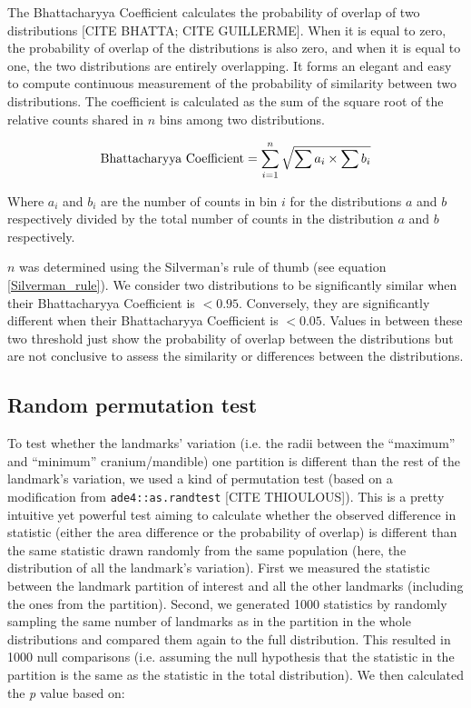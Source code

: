 \documentclass[a4paper,11pt]{article}
\begin{document}
The Bhattacharyya Coefficient calculates the probability of overlap of two distributions [CITE BHATTA; CITE GUILLERME].
When it is equal to zero, the probability of overlap of the distributions is also zero, and when it is equal to one, the two distributions are entirely overlapping.
It forms an elegant and easy to compute continuous measurement of the probability of similarity between two distributions.
The coefficient is calculated as the sum of the square root of the relative counts shared in $n$ bins among two distributions.

\begin{equation}
    \textnormal{Bhattacharyya Coefficient}=\sum_{i=1}^{n} \sqrt{{\sum{a_i}}\times{\sum{b_i}}}
\end{equation}

\noindent Where ${a_i}$ and ${b_i}$  are the number of counts in bin $i$ for the distributions $a$ and $b$ respectively divided by the total number of counts in the distribution $a$ and $b$ respectively.

$n$ was determined using the Silverman's rule of thumb (see equation \ref{Silverman_rule}).
We consider two distributions to be significantly similar when their Bhattacharyya Coefficient is $< 0.95$.
Conversely, they are significantly different when their Bhattacharyya Coefficient is $< 0.05$.
Values in between these two threshold just show the probability of overlap between the distributions but are not conclusive to assess the similarity or differences between the distributions.

\subsection{Random permutation test}

To test whether the landmarks' variation (i.e. the radii between the ``maximum'' and ``minimum'' cranium/mandible) one partition is different than the rest of the landmark's variation, we used a kind of permutation test (based on a modification from \texttt{ade4::as.randtest} [CITE THIOULOUS]).
This is a pretty intuitive yet powerful test aiming to calculate whether the observed difference in statistic (either the area difference or the probability of overlap) is different than the same statistic drawn randomly from the same population (here, the distribution of all the landmark's variation).
First we measured the statistic between the landmark partition of interest and all the other landmarks (including the ones from the partition).
Second, we generated 1000 statistics by randomly sampling the same number of landmarks as in the partition in the whole distributions and compared them again to the full distribution.
This resulted in 1000 null comparisons (i.e. assuming the null hypothesis that the statistic in the partition is the same as the statistic in the total distribution).
We then calculated the \textit{p} value based on:
\end{document}
